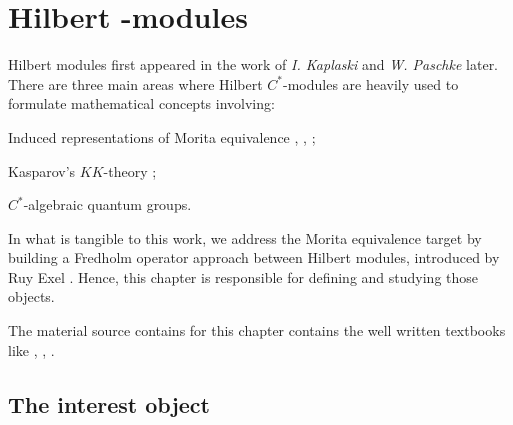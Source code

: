 \chapter[Hilbert \texorpdfstring{\ensuremath{C^*}}{C*}-modules]{Hilbert \texorpdfstring{}{C*}-modules}
\label{ch:hilbert modules}

Hilbert modules first appeared in the work of \textit{I. Kaplaski} \cite{kaplansky1953modules} and \textit{W. Paschke} \cite{paschke1973inner} later. There are three main areas where Hilbert $C^*$-modules are heavily used to formulate mathematical concepts involving:
\begin{itroman}
    \item\label{main areas (i)} Induced representations of Morita equivalence \cite{brown1977stable}, \cite{RIEFFEL1974176}, \cite{rieffel1981c};
    \item Kasparov's $KK$-theory \cite{kasparov1980stinespring};
    \item $C^*$-algebraic quantum groups.
\end{itroman}

In what is tangible to this work, we address the Morita equivalence target by building a Fredholm operator approach between Hilbert modules, introduced by Ruy Exel \cite{exel7fredholm}. Hence, this chapter is responsible for defining and studying those objects.

The material source contains for this chapter contains the well written textbooks like \cite{lance1995hilbert}, \cite{jensen2012elements}, \cite{manuilov2001hilbert}.

\section{The interest object}
\label{sec:definicao de hilbert c-star-modules}



